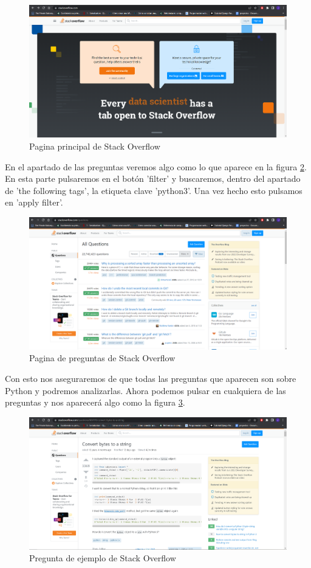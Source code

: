 \documentclass[a4paper, 12pt]{book}
\begin{document}
\begin{figure}
    \includegraphics[bb=0 0 800 600, width=12cm, keepaspectratio]{img/stack1}
    \caption{Pagina principal de Stack Overflow}
    \label{figura:stack1}
 \end{figure}
 
En el apartado de las preguntas veremos algo como lo que aparece en la figura \ref{figura:stack2}. En esta parte pulsaremos en el botón 'filter' y buscaremos, dentro del apartado de 'the following tags', la etiqueta clave 'python3'. Una vez hecho esto pulsamos en 'apply filter'.

\begin{figure}
    \includegraphics[bb=0 0 800 600, width=12cm, keepaspectratio]{img/stack2}
    \caption{Pagina de preguntas de Stack Overflow}
    \label{figura:stack2}
 \end{figure}
 
Con esto nos aseguraremos de que todas las preguntas que aparecen son sobre Python y podremos analizarlas. Ahora podemos pulsar en cualquiera de las preguntas y nos aparecerá algo como la figura \ref{figura:stack3}. 


\begin{figure}
    \includegraphics[bb=0 0 800 600, width=12cm, keepaspectratio]{img/stack3}
    \caption{Pregunta de ejemplo de Stack Overflow}
    \label{figura:stack3}
 \end{figure}
 
\end{document}
